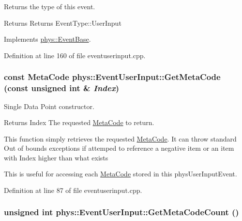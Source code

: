 Returns the type of this event. 

\begin{DoxyReturn}{Returns}
Returns EventType::UserInput 
\end{DoxyReturn}


Implements \hyperlink{classphys_1_1EventBase_a0f39a25f4b64f7cf701e174454616366}{phys::EventBase}.



Definition at line 160 of file eventuserinput.cpp.

\hypertarget{classphys_1_1EventUserInput_aaf56168b98e339cec74ae862b64632ba}{
\subsubsection[{GetMetaCode}]{\setlength{\rightskip}{0pt plus 5cm}const {\bf MetaCode} phys::EventUserInput::GetMetaCode (const unsigned int \& {\em Index})}}
\label{d7/df5/classphys_1_1EventUserInput_aaf56168b98e339cec74ae862b64632ba}


Single Data Point constructor. 

\begin{DoxyReturn}{Returns}
Index The requested \hyperlink{classphys_1_1MetaCode}{MetaCode} to return.
\end{DoxyReturn}
This function simply retrieves the requested \hyperlink{classphys_1_1MetaCode}{MetaCode}. It can throw standard Out of bounds exceptions if attemped to reference a negative item or an item with Index higher than what exists \par
 This is useful for accessing each \hyperlink{classphys_1_1MetaCode}{MetaCode} stored in this physUserInputEvent. 

Definition at line 87 of file eventuserinput.cpp.

\hypertarget{classphys_1_1EventUserInput_a17aa65dcf0ef8689affa50232eec4ccb}{
\subsubsection[{GetMetaCodeCount}]{\setlength{\rightskip}{0pt plus 5cm}unsigned int phys::EventUserInput::GetMetaCodeCount ()}}
\label{d7/df5/classphys_1_1EventUserInput_a17aa65dcf0ef8689affa50232eec4ccb}


